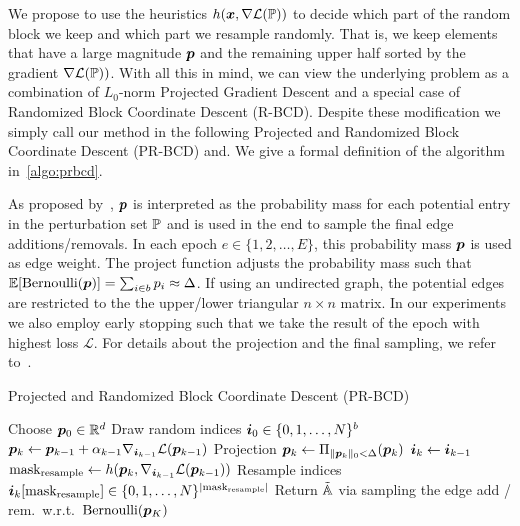 \documentclass{article} %
\begin{document}
We propose to use the heuristics \(h({\bm{x}}, \nabla \mathcal{L}({\mathbb{P}}))\) to decide which part of the random block we keep and which part we resample randomly. That is, we keep elements that have a large magnitude \({\bm{p}}\) and the remaining upper half sorted by the gradient \(\nabla \mathcal{L}({\mathbb{P}}))\). With all this in mind, we can view the underlying problem as a combination of \(L_0\)-norm Projected Gradient Descent and a special case of Randomized Block Coordinate Descent (R-BCD). Despite these modification we simply call our method in the following Projected and Randomized Block Coordinate Descent (PR-BCD) and. We give a formal definition of the algorithm in~\autoref{algo:prbcd}.
 
As proposed by~\citet{Xu2019a}, \({\bm{p}}\) is interpreted as the probability mass for each potential entry in the perturbation set \({\mathbb{P}}\) and is used in the end to sample the final edge additions/removals. In each epoch \(e \in \{1,2, \dots, E\}\), this probability mass \({\bm{p}}\) is used as edge weight. The project function adjusts the probability mass such that \(\mathbb{E}[\text{Bernoulli}({\bm{p}})] = \sum_{i \in b} {p}_i \approx \Delta\). If using an undirected graph, the potential edges are restricted to the the upper/lower triangular \(n \times n\) matrix. In our experiments we also employ early stopping such that we take the result of the epoch with highest loss \(\mathcal{L}\). For details about the projection and the final sampling, we refer to~\citet{Xu2019a}.
 
\begin{algorithm}[h]
	\caption{Projected and Randomized Block Coordinate Descent (PR-BCD)}
	\label{algo:prbcd}
	\begin{algorithmic}
	\STATE Choose \({\bm{p}}_0 \in \mathbb{R}^d\)
	\STATE Draw random indices \({\bm{i}}_0 \in \{0, 1, \dots, N\}^b\)
	    \STATE \({\bm{p}}_{k} \leftarrow {\bm{p}}_{k-1} + \alpha_{k-1} \nabla_{{\bm{i}}_{k-1}} \mathcal{L}({\bm{p}}_{k-1})\)
	    \STATE Projection \({\bm{p}}_{k} \leftarrow \Pi_{\|{\bm{p}}_{k}\|_0 < \Delta} ({\bm{p}}_{k})\)
	    \STATE \({\bm{i}}_{k} \leftarrow {\bm{i}}_{k-1}\)
	        \STATE \(\text{mask}_{\text{resample}} \leftarrow h({\bm{p}}_{k}, \nabla_{{\bm{i}}_{k-1}} \mathcal{L}({\bm{p}}_{k-1}))\)
	        \STATE Resample indices \({\bm{i}}_{k}[\text{mask}_{\text{resample}}] \in \{0, 1, \dots, N\}^{|\text{mask}_{\text{resample}}|}\)
	    \ENDIF
	\ENDFOR
    \STATE Return \(\tilde{{\mathbb{A}}}\) via sampling the edge add / rem.~w.r.t.~\(\text{Bernoulli}({\bm{p}}_{K})\) 
	\end{algorithmic}
\end{algorithm}
\end{document}
